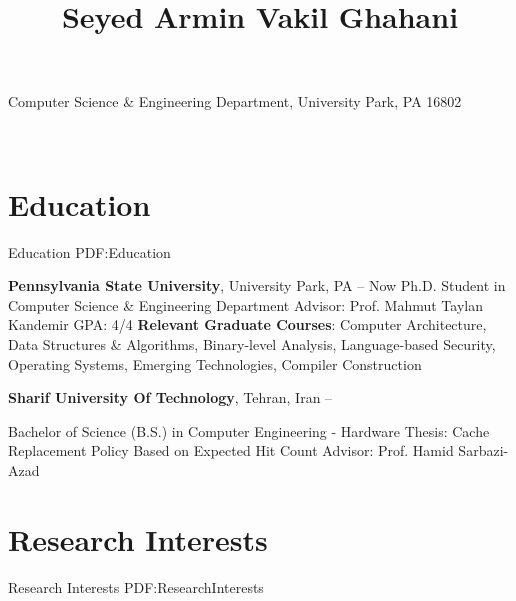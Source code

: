 \documentclass[a4paper,9pt,oneside]{article}
\newcommand{\CVAuthor}{Seyed Armin Vakil Ghahani}
\begin{document}

\title{\CVAuthor}
\begin{subtitle}

\faInstitution Computer Science \& Engineering Department, University Park, PA 16802
\par
\Large{
\href{https://arminvakil.github.io/}{\faGlobe}
\href{mailto:arminvakil@psu.edu}{\faEnvelope}
\href{https://www.linkedin.com/in/arminvakil}{\faLinkedinSquare}
\href{https://github.com/arminvakil}{\faGithubSquare}
\href{https://scholar.google.com/citations?user=OHnTCysAAAAJ&hl=en}{\faGraduationCap}}
\
\end{subtitle}

\begin{body}


\section
{Education}
{Education}
{PDF:Education}

\textbf{Pennsylvania State University},
University Park, PA
\hfill
{} --
Now
\GapNoBreak
\BulletItem
Ph.D. Student in
Computer Science \& Engineering Department
\SubBulletItem
Advisor: Prof. Mahmut Taylan Kandemir
\SubBulletItem
GPA: 4/4
\SubBulletItem
\textbf{Relevant Graduate Courses}: Computer Architecture, Data Structures \& Algorithms, Binary-level Analysis, Language-based Security, Operating Systems, Emerging Technologies, Compiler Construction

\BigGap

\textbf{Sharif University Of Technology},
Tehran, Iran
\hfill
{} --

\GapNoBreak
\BulletItem
Bachelor of Science (B.S.) in
Computer Engineering - Hardware
\SubBulletItem
Thesis: Cache Replacement Policy Based on Expected Hit Count
\newline
Advisor: Prof. Hamid Sarbazi-Azad



\section
{Research Interests}
{Research Interests}
{PDF:ResearchInterests}


\end{body}
\end{document}
